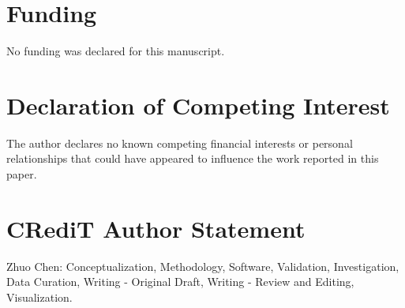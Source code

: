\documentclass[preprint,12pt]{elsarticle}
\begin{document}
\section*{Funding}

No funding was declared for this manuscript.

\section*{Declaration of Competing Interest}

The author declares no known competing financial interests or personal
relationships that could have appeared to influence the work reported in this
paper.

\section*{CRediT Author Statement}

Zhuo Chen: Conceptualization, Methodology, Software, Validation,
Investigation, Data Curation, Writing - Original Draft, Writing - Review and
Editing, Visualization.



\end{document}
